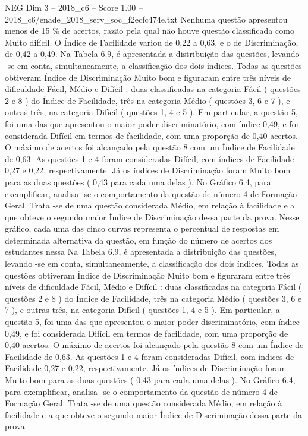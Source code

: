 \begin{textsample}{NEG Dim 3 – 2018\_c6 – Score 1.00 – 2018\_c6/enade\_2018\_serv\_soc\_f2ecfc474e.txt}
Nenhuma questão apresentou menos de 15 \% de acertos, razão pela qual não houve questão classificada como Muito difícil.
O Índice de Facilidade variou de 0,22 a 0,63, e o de Discriminação, de 0,42 a 0,49.
Na Tabela 6.9, é apresentada a distribuição das questões, levando -se em conta, simultaneamente, a classificação dos dois índices.
Todas as questões obtiveram Índice de Discriminação Muito bom e figuraram entre três níveis de dificuldade Fácil, Médio e Difícil : duas classificadas na categoria Fácil ( questões 2 e 8 ) do Índice de Facilidade, três na categoria Médio ( questões 3, 6 e 7 ), e outras três, na categoria Difícil ( questões 1, 4 e 5 ).
Em particular, a questão 5, foi uma das que apresentou o maior poder discriminatório, com índice 0,49, e foi considerada Difícil em termos de facilidade, com uma proporção de 0,40 acertos.
O máximo de acertos foi alcançado pela questão 8 com um Índice de Facilidade de 0,63.
As questões 1 e 4 foram consideradas Difícil, com índices de Facilidade 0,27 e 0,22, respectivamente.
Já os índices de Discriminação foram Muito bom para as duas questões ( 0,43 para cada uma delas ).
No Gráfico 6.4, para exemplificar, analisa -se o comportamento da questão de número 4 de Formação Geral.
Trata -se de uma questão considerada Médio, em relação à facilidade e a que obteve o segundo maior Índice de Discriminação dessa parte da prova.
Nesse gráfico, cada uma das cinco curvas representa o percentual de respostas em determinada alternativa da questão, em função do número de acertos dos estudantes nessa Na Tabela 6.9, é apresentada a distribuição das questões, levando -se em conta, simultaneamente, a classificação dos dois índices.
Todas as questões obtiveram Índice de Discriminação Muito bom e figuraram entre três níveis de dificuldade Fácil, Médio e Difícil : duas classificadas na categoria Fácil ( questões 2 e 8 ) do Índice de Facilidade, três na categoria Médio ( questões 3, 6 e 7 ), e outras três, na categoria Difícil ( questões 1, 4 e 5 ).
Em particular, a questão 5, foi uma das que apresentou o maior poder discriminatório, com índice 0,49, e foi considerada Difícil em termos de facilidade, com uma proporção de 0,40 acertos.
O máximo de acertos foi alcançado pela questão 8 com um Índice de Facilidade de 0,63.
As questões 1 e 4 foram consideradas Difícil, com índices de Facilidade 0,27 e 0,22, respectivamente.
Já os índices de Discriminação foram Muito bom para as duas questões ( 0,43 para cada uma delas ).
No Gráfico 6.4, para exemplificar, analisa -se o comportamento da questão de número 4 de Formação Geral.
Trata -se de uma questão considerada Médio, em relação à facilidade e a que obteve o segundo maior Índice de Discriminação dessa parte da prova.

\end{textsample}
